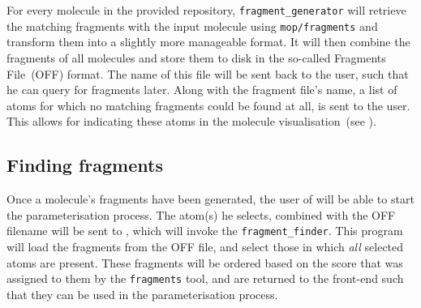 For every molecule in the provided repository, \verb|fragment_generator| will retrieve the matching fragments with the input molecule using \verb|mop/fragments| and transform them into a slightly more manageable format. It will then combine the fragments of all molecules and store them to disk in the so-called \omfraf{} Fragments File~(OFF) format. The name of this file will be sent back to the \oframp{} user, such that he can query for fragments later. Along with the fragment file's name, a list of atoms for which no matching fragments could be found at all, is sent to the user. This allows for indicating these atoms in the molecule visualisation~(see ).


\subsection{Finding fragments}
Once a molecule's fragments have been generated, the user of \oframp{} will be able to start the parameterisation process. The atom(s) he selects, combined with the OFF filename will be sent to \omfraf, which will invoke the \verb|fragment_finder|. This program will load the fragments from the OFF file, and select those in which \emph{all} selected atoms are present. These fragments will be ordered based on the score that was assigned to them by the \verb|fragments| tool, and are returned to the \oframp{} front-end such that they can be used in the parameterisation process.
